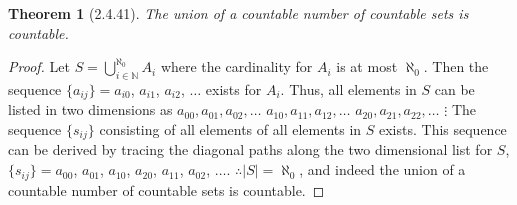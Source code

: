 \documentclass[a4paper, 12pt]{article}
\theoremstyle{plain}
\newtheorem*{theorem*}{Theorem}
\begin{document}
	
	\begin{theorem*}[2.4.41]
		The union of a countable number of countable sets is countable.
	\end{theorem*}
	
	\begin{proof}
		Let $S = \bigcup_{i \in \mathbb{N}}^{\aleph_0} A_i$ where the cardinality for $A_i$ is at most $\aleph_0$. Then the sequence $\{a_{ij}\} = a_{i0}$, $a_{i1}$, $a_{i2}$, $\dots$ exists for $A_i$. Thus, all elements in $S$ can be listed in two dimensions as \newline \indent $a_{00}, a_{01}, a_{02}, \dots$ \newline \indent $a_{10}, a_{11}, a_{12}, \dots$ \newline \indent $a_{20}, a_{21}, a_{22}, \dots$ \newline \indent \indent $\vdots$ \newline The sequence $\{s_{ij}\}$ consisting of all elements of all elements in $S$ exists. This sequence can be derived by tracing the diagonal paths along the two dimensional list for $S$, \newline \indent $\{s_{ij}\} = a_{00}$, $a_{01}$, $a_{10}$, $a_{20}$, $a_{11}$, $a_{02}$, $\dots$. \newline $\therefore |S| = \aleph_0$, and indeed the union of a countable number of countable sets is countable.
	\end{proof}
\end{document}
